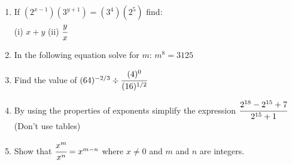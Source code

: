 \begin{enumerate}
	\item If $\left(2^{x - 1}\right)\left(3^{y + 1}\right) = \left(3^4\right)\left(2^5\right)$ find:\\
	(i) $x + y$ 	(ii) $\cfrac{y}{x}$
	
	\item In the following equation solve for $m$: $m^8 = 3125$
	
	\item Find the value of $(64)^{-2/3} \div \cfrac{(4)^0}{(16)^{1/2}}$
		
	\item By using the properties of exponents simplify the expression $\cfrac{2^{18} - 2^{15} + 7}{2^{15} + 1}$ (Don't use tables)
	
	\item Show that $\cfrac{x^m}{x^n} = x^{m - n}$ where $x \neq 0$ and $m$ and $n$ are integers.
	
\end{enumerate}	
	
